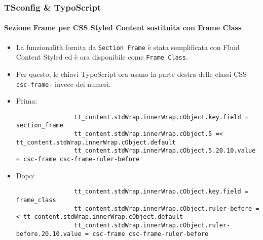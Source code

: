 \begin{frame}[fragile]
	\frametitle{TSconfig \& TypoScript}
	\framesubtitle{Sezione Frame per CSS Styled Content sostituita con Frame Class}

	\lstset{basicstyle=\tiny\ttfamily}

	\begin{itemize}
		\item La funzionalità fornita da \texttt{Section Frame} è stata semplificata con Fluid Content Styled ed è ora disponibile come \texttt{Frame Class}.
		\item Per questo, le chiavi TypoScript ora usano la parte destra delle classi CSS \texttt{csc-frame-} invece dei numeri.
		\item Prima:

			\begin{lstlisting}
				tt_content.stdWrap.innerWrap.cObject.key.field = section_frame
				tt_content.stdWrap.innerWrap.cObject.5 =< tt_content.stdWrap.innerWrap.cObject.default
				tt_content.stdWrap.innerWrap.cObject.5.20.10.value = csc-frame csc-frame-ruler-before
			\end{lstlisting}

		\item Dopo:

			\begin{lstlisting}
				tt_content.stdWrap.innerWrap.cObject.key.field = frame_class
				tt_content.stdWrap.innerWrap.cObject.ruler-before =< tt_content.stdWrap.innerWrap.cObject.default
				tt_content.stdWrap.innerWrap.cObject.ruler-before.20.10.value = csc-frame csc-frame-ruler-before
			\end{lstlisting}

	\end{itemize}

\end{frame}

